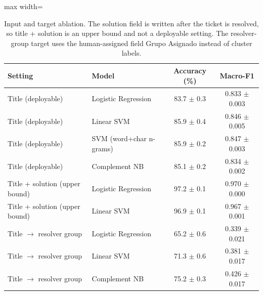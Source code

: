 \begin{table}[!t]
\centering
\caption{Input and target ablation. The solution field is written after the ticket is resolved, so title + solution is an upper bound and not a deployable setting. The resolver-group target uses the human-assigned field Grupo Asignado instead of cluster labels.}
\label{tab:ablation}
\footnotesize
\begin{adjustbox}{max width=\columnwidth}
\begin{tabular}{llcc}
\hline
Setting & Model & Accuracy (\%) & Macro-F1 \\
\hline
Title (deployable) & Logistic Regression & 83.7 $\pm$ 0.3 & 0.833 $\pm$ 0.003 \\
Title (deployable) & Linear SVM & 85.9 $\pm$ 0.4 & 0.846 $\pm$ 0.005 \\
Title (deployable) & SVM (word+char n-grams) & 85.9 $\pm$ 0.2 & 0.847 $\pm$ 0.003 \\
Title (deployable) & Complement NB & 85.1 $\pm$ 0.2 & 0.834 $\pm$ 0.002 \\
Title + solution (upper bound) & Logistic Regression & 97.2 $\pm$ 0.1 & 0.970 $\pm$ 0.000 \\
Title + solution (upper bound) & Linear SVM & 96.9 $\pm$ 0.1 & 0.967 $\pm$ 0.001 \\
Title $\rightarrow$ resolver group & Logistic Regression & 65.2 $\pm$ 0.6 & 0.339 $\pm$ 0.021 \\
Title $\rightarrow$ resolver group & Linear SVM & 71.3 $\pm$ 0.6 & 0.381 $\pm$ 0.017 \\
Title $\rightarrow$ resolver group & Complement NB & 75.2 $\pm$ 0.3 & 0.426 $\pm$ 0.017 \\
\hline
\end{tabular}
\end{adjustbox}
\end{table}
